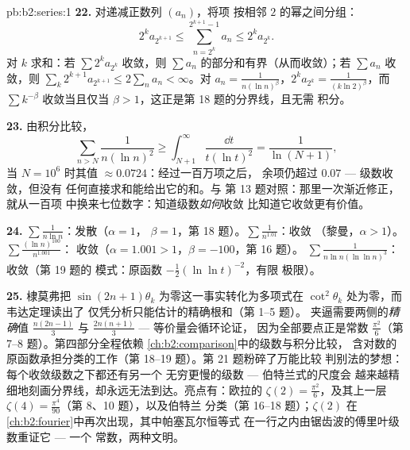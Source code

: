 \begin{solution}{pb:b2:series:1}
\textbf{22.} 对递减正数列 $(a_n)$，将项
按相邻 $2$ 的幂之间分组：
\[
2^{k}a_{2^{k+1}} \leq \sum_{n=2^k}^{2^{k+1}-1} a_n \leq
2^ka_{2^k} .
\]
对 $k$ 求和：若 $\sum 2^ka_{2^k}$ 收敛，则
$\sum a_n$ 的部分和有界（从而收敛）；若
$\sum a_n$ 收敛，则 $\sum_k 2^{k+1}a_{2^{k+1}} \leq 2\sum_n a_n <
\infty$。对 $a_n = \frac1{n(\ln n)^\beta}$，$2^ka_{2^k} =
\frac{1}{(k\ln 2)^\beta}$，而 $\sum k^{-\beta}$ 收敛当且仅当
$\beta > 1$，这正是第 18 题的分界线，且无需
积分。

\textbf{23.} 由积分比较，
\[
\sum_{n > N}\frac{1}{n(\ln n)^2} \geq
\int_{N+1}^{\infty}\frac{\dd t}{t(\ln t)^2} =
\frac{1}{\ln(N+1)},
\]
当 $N = 10^6$ 时其值 $\approx 0.0724$：经过一百万项之后，
余项仍超过 $0.07$ --- 级数收敛，但没有
任何直接求和能给出它的和。与
第 13 题对照：那里一次渐近修正，就从一百项
中换来七位数字：知道级数\emph{如何}收敛
比知道它收敛更有价值。

\textbf{24.} $\sum\frac1{n\ln n}$：发散（$\alpha = 1$，
$\beta = 1$，第 18 题）。$\sum\frac1{n^{1.01}}$：收敛
（黎曼，$\alpha > 1$）。$\sum\frac{(\ln n)^{100}}{n^{1.001}}$：
收敛（$\alpha = 1.001 > 1$，$\beta = -100$，第 16 题）。
$\sum\frac1{n\ln n(\ln\ln n)^3}$：收敛（第 19 题的
模式：原函数 $-\frac12(\ln\ln t)^{-2}$，有限
极限）。

\textbf{25.} 棣莫弗把 $\sin(2n{+}1)
\theta_k$ 为零这一事实转化为多项式在
$\cot^2\theta_k$ 处为零，而韦达定理读出了
仅凭分析只能估计的精确根和（第 1--5 题）。
夹逼需要两侧的\emph{精确}值 $\frac{n(2n-1)}3$ 与
$\frac{2n(n+1)}3$ --- 等价量会循环论证，
因为全部要点正是常数
$\frac{\pi^2}6$（第 7--8 题）。第四部分全程依赖
\cref{ch:b2:comparison}中的级数与积分比较，
含对数的原函数承担分类的工作（第
18--19 题）。第 21 题粉碎了万能比较
判别法的梦想：每个收敛级数之下都还有另一个
无穷更慢的级数 --- 伯特兰式的尺度会
越来越精细地刻画分界线，却永远无法到达。亮点有：欧拉的 $\zeta(2)
= \frac{\pi^2}6$，及其上一层 $\zeta(4) =
\frac{\pi^4}{90}$（第 8、10 题），以及伯特兰
分类（第 16--18 题）；$\zeta(2)$ 在
\cref{ch:b2:fourier}中再次出现，其中帕塞瓦尔恒等式
在一行之内由锯齿波的傅里叶级数重证它 --- 一个
常数，两种文明。
\end{solution}
